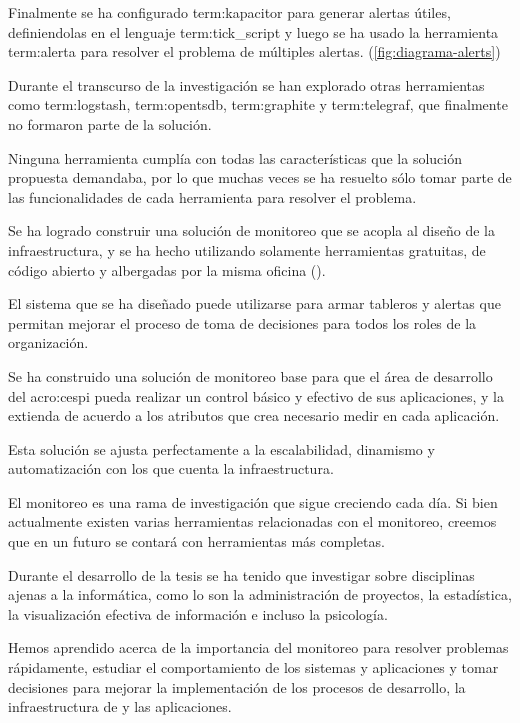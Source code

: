 Finalmente se ha configurado \gls{term:kapacitor} para generar alertas útiles,
definiendolas en el lenguaje \gls{term:tick_script} y luego se ha usado la
herramienta \gls{term:alerta} para resolver el problema de múltiples alertas.
(\autoref{fig:diagrama-alerts})

Durante el transcurso de la investigación se han explorado otras
herramientas como \gls{term:logstash}, \gls{term:opentsdb}, \gls{term:graphite}
y \gls{term:telegraf}, que finalmente no formaron parte de la solución.

Ninguna herramienta cumplía con todas las características que la solución
propuesta demandaba, por lo que muchas veces se ha resuelto sólo tomar parte de
las funcionalidades de cada herramienta para resolver el problema.

Se ha logrado construir una solución de monitoreo que se acopla al diseño de la
infraestructura, y se ha hecho utilizando solamente herramientas gratuitas,
de código abierto y albergadas por la misma oficina ().

El sistema que se ha diseñado puede utilizarse para armar tableros y alertas
que permitan mejorar el proceso de toma de decisiones para todos los roles de
la organización.

Se ha construido una solución de monitoreo base para que el
área de desarrollo del \gls{acro:cespi} pueda realizar un control básico y
efectivo de sus aplicaciones, y la extienda de acuerdo a los atributos que crea
necesario medir en cada aplicación.

Esta solución se ajusta perfectamente a la escalabilidad, dinamismo
y automatización con los que cuenta la infraestructura.

El monitoreo es una rama de investigación que sigue creciendo cada día. Si bien
actualmente existen varias herramientas relacionadas con el monitoreo, creemos
que en un futuro se contará con herramientas más completas.

Durante el desarrollo de la tesis se ha tenido que investigar sobre disciplinas
ajenas a la informática, como lo son la administración de proyectos, la
estadística, la visualización efectiva de información e incluso la psicología.

Hemos aprendido acerca de la importancia del monitoreo para resolver problemas
rápidamente, estudiar el comportamiento de los sistemas y aplicaciones y tomar
decisiones para mejorar la implementación de los procesos de desarrollo, la
infraestructura de  y las aplicaciones.
